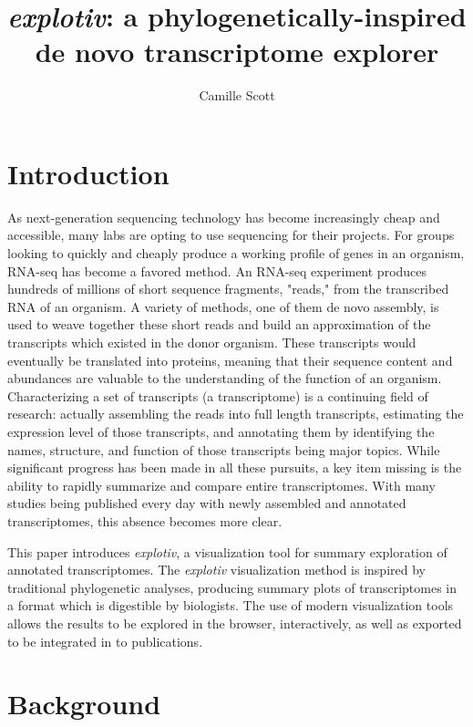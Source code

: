 \documentclass[12pt]{article} %
\title{\textit{explotiv}: a phylogenetically-inspired de novo transcriptome explorer}
\author{Camille Scott}
\begin{document}
\maketitle

\section{Introduction}

As next-generation sequencing technology has become increasingly cheap and accessible, many labs are opting to use sequencing for their projects. For groups looking to quickly and cheaply produce a working profile of genes in an organism, RNA-seq has become a favored method. An RNA-seq experiment produces hundreds of millions of short sequence fragments, "reads," from the transcribed RNA of an organism. A variety of methods, one of them de novo assembly, is used to weave together these short reads
and build an approximation of the transcripts which existed in the donor organism. These transcripts would eventually be translated
 into proteins, meaning that their sequence content and abundances are valuable to the understanding of the function of an organism.
 Characterizing a set of transcripts (a transcriptome) is a continuing field of research: actually assembling the reads into full length
 transcripts, estimating the expression level of those transcripts, and annotating them by identifying the names, structure, and function
 of those transcripts being major topics. While significant progress has been made in all these pursuits, a key item missing is the ability to
 rapidly summarize and compare entire transcriptomes. With many studies being published every day with newly assembled and annotated transcriptomes, this absence becomes more clear.
 
 This paper introduces \textit{explotiv}, a visualization tool for summary exploration of annotated transcriptomes. The \textit{explotiv}
 visualization method is inspired by traditional phylogenetic analyses, producing summary plots of transcriptomes in a format
 which is digestible by biologists. The use of modern visualization tools allows the results to be explored in the browser, interactively,
 as well as exported to be integrated in to publications.

\section{Background}
\end{document}
